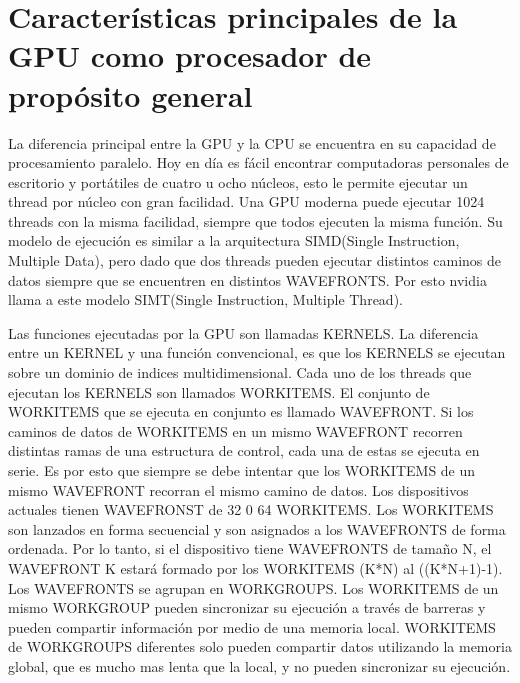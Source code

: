 
\chapter{Características principales de la GPU como procesador de propósito
general}

La diferencia principal entre la GPU y la CPU se encuentra en su capacidad de
procesamiento paralelo. Hoy en día es fácil encontrar computadoras personales de
escritorio y portátiles de cuatro u ocho núcleos, esto le permite ejecutar un
thread por núcleo con gran facilidad. Una GPU moderna puede ejecutar 1024
threads con la misma facilidad, siempre que todos ejecuten la misma función. Su
modelo de ejecución es similar a la arquitectura SIMD(Single Instruction,
Multiple Data), pero dado que dos threads pueden ejecutar distintos caminos de
datos siempre que se encuentren en distintos WAVEFRONTS. Por esto nvidia llama a
este modelo SIMT(Single Instruction, Multiple Thread).

Las funciones ejecutadas por la GPU son llamadas KERNELS. La diferencia entre un
KERNEL y una función convencional, es que los KERNELS se ejecutan sobre un
dominio de indices multidimensional. Cada uno de los threads que ejecutan los
KERNELS son llamados WORKITEMS. El conjunto de WORKITEMS que se ejecuta en
conjunto es llamado WAVEFRONT. Si los caminos de datos de  WORKITEMS en un mismo
WAVEFRONT recorren distintas ramas de una estructura de control, cada una de
estas se ejecuta en serie. Es por esto que siempre se debe intentar que los
WORKITEMS de un mismo WAVEFRONT recorran el mismo camino de datos. Los
dispositivos actuales tienen WAVEFRONST de 32 0 64 WORKITEMS. Los WORKITEMS son
lanzados en forma secuencial y son asignados a los WAVEFRONTS de forma ordenada.
Por lo tanto, si el dispositivo tiene WAVEFRONTS de tamaño N, el WAVEFRONT K
estará formado por los WORKITEMS (K*N) al ((K*N+1)-1). Los WAVEFRONTS se agrupan
en WORKGROUPS. Los WORKITEMS de un mismo WORKGROUP pueden sincronizar su
ejecución a través de barreras y pueden compartir información por medio de una
memoria local. WORKITEMS de WORKGROUPS diferentes solo pueden compartir datos
utilizando la memoria global, que es mucho mas lenta que la local, y no pueden
sincronizar su ejecución.

